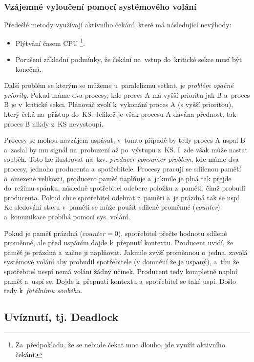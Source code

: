 \subsubsection{Vzájemné vyloučení pomocí systémového volání}

Předešlé metody využívají aktivního čekání, které má následující nevýhody:

\begin{itemize}[noitemsep]
	\item Plýtvání časem CPU%
	\footnote{Za~předpokladu, že se nebude čekat moc dlouho, jde využít aktivního čekání.}.
	\item Porušení základní podmínky, že čekání na~vstup do~kritické sekce musí být konečná.
\end{itemize}

Další problém se kterým se můžeme u~paralelizmu setkat, je \emph{problém opačné priority}. Pokud máme dva procesy, kde proces A má vyšší prioritu jak B a~proces B je v~kritické sekci. Plánovač zvolí k~vykonání proces A (s vyšší prioritou), který čeká na~přístup do~KS. Jelikož je však procesu A dávána přednost, tak proces B nikdy z~KS nevystoupí. 

Procesy se mohou navzájem uspávat, v~tomto případě by tedy proces A uspal B a~zaslal by mu signál na~probuzení až po~výstupu z~KS. I~zde však může nastat souběh. Toto lze ilustrovat na~tzv. \emph{producer-consumer problem}, kde máme dva procesy, jednoho producenta a~spotřebitele. Procesy pracují se sdílenou pamětí o~omezené velikosti, producent paměť naplňuje a~jakmile je plná tak přejde do~režimu spánku, následně spotřebitel odebere položku z~paměti, čímž probudí producenta. Pokud chce spotřebitel odebrat z~paměti a~je prázdná tak se uspí. Ke sledování stavu v~paměti se může použít sdílené proměnné (\emph{counter}) a~komunikace probíhá pomocí sys. volání.

Pokud je paměť prázdná ($counter = 0$), spotřebitel přečte hodnotu sdílené proměnné, ale před uspáním dojde k~přepnutí kontextu. Producent uvidí, že paměť je prázdná a~začne ji naplňovat. Jakmile zvýší proměnnou o~jedna, zavolá systémové volání aby probudil spotřebitele (v domnění že je uspaný), a~tím že spotřebitel nespí nemá volání žádný účinek. Producent tedy kompletně naplní paměť a~uspí se. Dojde k~přepnutí kontextu a~spotřebitel se také uspí. Došlo tedy k~\emph{fatálnímu souběhu}.

\subsection{Uvíznutí, tj. Deadlock}

